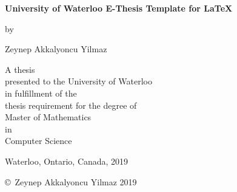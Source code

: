 \pagestyle{empty}

\begin{titlepage}
        \begin{center}
        \vspace*{1.0cm}

        \Huge
        {\bf University of Waterloo E-Thesis Template for \LaTeX }

        \vspace*{1.0cm}

        \normalsize
        by \\

        \vspace*{1.0cm}

        \Large
        Zeynep Akkalyoncu Yilmaz \\

        \vspace*{3.0cm}

        \normalsize
        A thesis \\
        presented to the University of Waterloo \\ 
        in fulfillment of the \\
        thesis requirement for the degree of \\
        Master of Mathematics \\
        in \\
        Computer Science \\

        \vspace*{2.0cm}

        Waterloo, Ontario, Canada, 2019 \\

        \vspace*{1.0cm}

        \copyright\ Zeynep Akkalyoncu Yilmaz 2019 \\
        \end{center}
\end{titlepage}

\pagestyle{plain}
\setcounter{page}{2}

